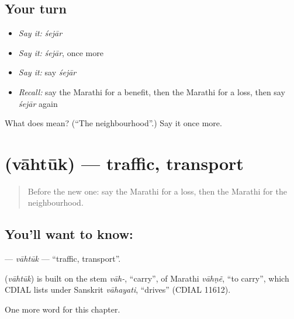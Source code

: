 \subsection*{Your turn}
\begin{itemize}
\raggedright
  \item \emph{Say it:} \emph{śejār}
  \item \emph{Say it:} \emph{śejār}, once more
  \item \emph{Say it:} say \emph{śejār}
  \item \emph{Recall:} say the Marathi for a benefit, then the Marathi for a loss, then say \emph{śejār} again
\end{itemize}

\begin{tcolorbox}[breakable,colback=teal!4,colframe=teal!35!black,title={Before you move on}]
What does  mean? (\textquotedblleft{}The neighbourhood\textquotedblright{}.) Say it once more.
\end{tcolorbox}
\section[\texorpdfstring{\mr{वाहतूक} (vāhtūk)}{वाहतूक (vāhtūk)}]{ (vāhtūk) — traffic, transport}

\label{lesson:MR-C190-vahtuk}



\begin{quote}
Before the new one: say the Marathi for a loss, then the Marathi for the neighbourhood.
\end{quote}

\subsection*{You'll want to know: }
\textbf{} — \emph{vāhtūk} — \textquotedblleft{}traffic, transport\textquotedblright{}.

\begin{cousinweb}
\textbf{} (\emph{vāhtūk}) is built on the stem \emph{vāh-}, \textquotedblleft{}carry\textquotedblright{}, of Marathi \emph{vāhṇẽ}, \textquotedblleft{}to carry\textquotedblright{}, which CDIAL lists under Sanskrit \emph{vāhayati}, \textquotedblleft{}drives\textquotedblright{} (CDIAL 11612).
\end{cousinweb}

\begin{grammarlens}[title={What you've built}]
One more word for this chapter.
\end{grammarlens}

